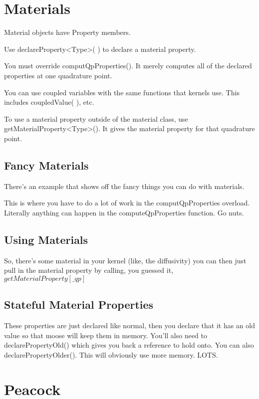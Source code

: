 \section{Materials}
Material objects have Property members. 

Use declareProperty<Type>( ) to declare a material property. 

You must override computQpProperties(). It merely computes all of the declared 
properties at one quadrature point. 

You can use coupled variables with the same functions that kernels use. This 
includes coupledValue( ), etc.

To use a material property outside of the material class, use 
getMaterialProperty<Type>(). It gives the material property for that quadrature 
point. 

\subsection{Fancy Materials}

There's an example that shows off the fancy things you can do with materials.

This is where you have to do a lot of work in the computQpProperties overload. 
Literally anything can happen in the computeQpProperties function. Go nuts.

\subsection{Using Materials}
So, there's some material in your kernel (like, the diffusivity) you can then 
just pull in the material property by calling, you guessed it, 
$getMaterialProperty[\_qp]$



\subsection{Stateful Material Properties}
These properties are just declared like normal, then you declare that it has an 
old value so that moose will keep them in memory. You'll also need to 
declarePropertyOld() which gives you back a reference to hold onto. You can also 
declarePropertyOlder(). This will obviously use more memory. LOTS.

\section{Peacock}

